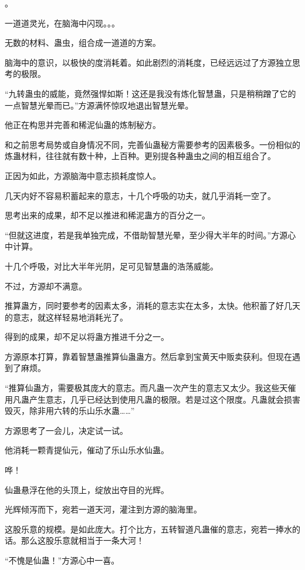 
\begin{this_body}

。

一道道灵光，在脑海中闪现。。。

无数的材料、蛊虫，组合成一道道的方案。

脑海中的意识，以极快的度消耗着。如此剧烈的消耗度，已经远远过了方源独立思考的极限。

“九转蛊虫的威能，竟然强悍如斯！这还是我没有炼化智慧蛊，只是稍稍蹭了它的一点智慧光晕而已。”方源满怀惊叹地退出智慧光晕。

他正在构思并完善和稀泥仙蛊的炼制秘方。

和之前思考局势或自身情况不同，完善仙蛊秘方需要参考的因素极多。一份相似的炼蛊材料，往往就有数十种，上百种。更别提各种蛊虫之间的相互组合了。

正因为如此，方源脑海中意志损耗度惊人。

几天内好不容易积蓄起来的意志，十几个呼吸的功夫，就几乎消耗一空了。

思考出来的成果，却不足以推进和稀泥蛊方的百分之一。

“但就这进度，若是我单独完成，不借助智慧光晕，至少得大半年的时间。”方源心中计算。

十几个呼吸，对比大半年光阴，足可见智慧蛊的浩荡威能。

不过，方源却不满意。

推算蛊方，同时要参考的因素太多，消耗的意志实在太多，太快。他积蓄了好几天的意志，就这样轻易地消耗光了。

得到的成果，却不足以将蛊方推进千分之一。

方源原本打算，靠着智慧蛊推算仙蛊蛊方。然后拿到宝黄天中贩卖获利。但现在遇到了麻烦。

“推算仙蛊方，需要极其庞大的意志。而凡蛊一次产生的意志又太少。我这些天催用凡蛊产生意志，几乎已经达到使用凡蛊的极限。若是过这个限度。凡蛊就会损害毁灭，除非用六转的乐山乐水蛊……”

方源思考了一会儿，决定试一试。

他消耗一颗青提仙元，催动了乐山乐水仙蛊。

哗！

仙蛊悬浮在他的头顶上，绽放出夺目的光辉。

光辉倾泻而下，宛若一道天河，灌注到方源的脑海里。

这股乐意的规模。是如此庞大。打个比方，五转智道凡蛊催的意志，宛若一捧水的话。那么这股乐意就相当于一条大河！

“不愧是仙蛊！”方源心中一喜。


\end{this_body}

